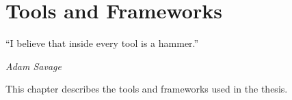 \chapter{Tools and Frameworks}
\label{c:tools}

\epigraph{``I believe that inside every tool is a hammer.''}{\emph{Adam Savage}}

This chapter describes the tools and frameworks used in the thesis.
